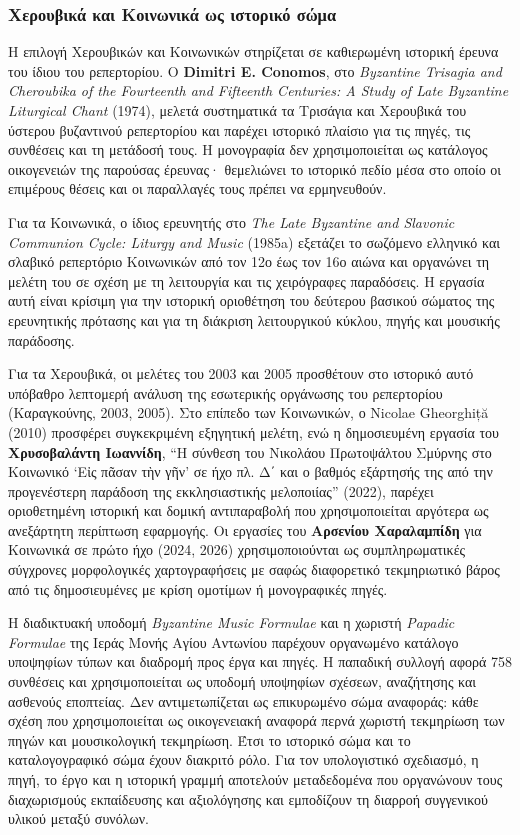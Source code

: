 \documentclass[11pt,a4paper]{article}
\begin{document}
\subsubsection{Χερουβικά και Κοινωνικά ως ιστορικό σώμα}

Η επιλογή Χερουβικών και Κοινωνικών στηρίζεται σε καθιερωμένη ιστορική έρευνα του ίδιου του ρεπερτορίου. Ο \textbf{Dimitri E. Conomos}, στο \emph{Byzantine Trisagia and Cheroubika of the Fourteenth and Fifteenth Centuries: A Study of Late Byzantine Liturgical Chant} (1974), μελετά συστηματικά τα Τρισάγια και Χερουβικά του ύστερου βυζαντινού ρεπερτορίου και παρέχει ιστορικό πλαίσιο για τις πηγές, τις συνθέσεις και τη μετάδοσή τους. Η μονογραφία δεν χρησιμοποιείται ως κατάλογος οικογενειών της παρούσας έρευνας· θεμελιώνει το ιστορικό πεδίο μέσα στο οποίο οι επιμέρους θέσεις και οι παραλλαγές τους πρέπει να ερμηνευθούν.

Για τα Κοινωνικά, ο ίδιος ερευνητής στο \emph{The Late Byzantine and Slavonic Communion Cycle: Liturgy and Music} (1985a) εξετάζει το σωζόμενο ελληνικό και σλαβικό ρεπερτόριο Κοινωνικών από τον 12ο έως τον 16ο αιώνα και οργανώνει τη μελέτη του σε σχέση με τη λειτουργία και τις χειρόγραφες παραδόσεις. Η εργασία αυτή είναι κρίσιμη για την ιστορική οριοθέτηση του δεύτερου βασικού σώματος της ερευνητικής πρότασης και για τη διάκριση λειτουργικού κύκλου, πηγής και μουσικής παράδοσης.

Για τα Χερουβικά, οι μελέτες του 2003 και 2005 προσθέτουν στο ιστορικό αυτό υπόβαθρο λεπτομερή ανάλυση της εσωτερικής οργάνωσης του ρεπερτορίου (Καραγκούνης, 2003, 2005). Στο επίπεδο των Κοινωνικών, ο Nicolae Gheorghiță (2010) προσφέρει συγκεκριμένη εξηγητική μελέτη, ενώ η δημοσιευμένη εργασία του \textbf{Χρυσοβαλάντη Ιωαννίδη}, ``Η σύνθεση του Νικολάου Πρωτοψάλτου Σμύρνης στο Κοινωνικό `Εἰς πᾶσαν τὴν γῆν' σε ήχο πλ. Δ΄ και ο βαθμός εξάρτησής της από την προγενέστερη παράδοση της εκκλησιαστικής μελοποιίας'' (2022), παρέχει οριοθετημένη ιστορική και δομική αντιπαραβολή που χρησιμοποιείται αργότερα ως ανεξάρτητη περίπτωση εφαρμογής. Οι εργασίες του \textbf{Αρσενίου Χαραλαμπίδη} για Κοινωνικά σε πρώτο ήχο (2024, 2026) χρησιμοποιούνται ως συμπληρωματικές σύγχρονες μορφολογικές χαρτογραφήσεις με σαφώς διαφορετικό τεκμηριωτικό βάρος από τις δημοσιευμένες με κρίση ομοτίμων ή μονογραφικές πηγές.

Η διαδικτυακή υποδομή \emph{Byzantine Music Formulae} και η χωριστή \emph{Papadic Formulae} της Ιεράς Μονής Αγίου Αντωνίου παρέχουν οργανωμένο κατάλογο υποψηφίων τύπων και διαδρομή προς έργα και πηγές. Η παπαδική συλλογή αφορά 758 συνθέσεις και χρησιμοποιείται ως υποδομή υποψηφίων σχέσεων, αναζήτησης και ασθενούς εποπτείας. Δεν αντιμετωπίζεται ως επικυρωμένο σώμα αναφοράς: κάθε σχέση που χρησιμοποιείται ως οικογενειακή αναφορά περνά χωριστή τεκμηρίωση των πηγών και μουσικολογική τεκμηρίωση. Έτσι το ιστορικό σώμα και το καταλογογραφικό σώμα έχουν διακριτό ρόλο. Για τον υπολογιστικό σχεδιασμό, η πηγή, το έργο και η ιστορική γραμμή αποτελούν μεταδεδομένα που οργανώνουν τους διαχωρισμούς εκπαίδευσης και αξιολόγησης και εμποδίζουν τη διαρροή συγγενικού υλικού μεταξύ συνόλων.
\end{document}
